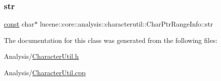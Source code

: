 \subsubsection{\texorpdfstring{str}{str}}
{\footnotesize\ttfamily \mbox{\hyperlink{ZlibCrc32_8h_a2c212835823e3c54a8ab6d95c652660e}{const}} char$\ast$ lucene\+::core\+::analysis\+::characterutil\+::\+Char\+Ptr\+Range\+Info\+::str}



The documentation for this class was generated from the following files\+:\begin{DoxyCompactItemize}
\item 
Analysis/\mbox{\hyperlink{CharacterUtil_8h}{Character\+Util.\+h}}\item 
Analysis/\mbox{\hyperlink{CharacterUtil_8cpp}{Character\+Util.\+cpp}}\end{DoxyCompactItemize}
